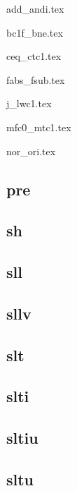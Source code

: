 

{add_andi.tex}

{bc1f_bne.tex}

{ceq_ctc1.tex}

{fabs_fsub.tex}

{j_lwc1.tex}

{mfc0_mtc1.tex}

{nor_ori.tex}

\subsection*{pre}

\subsection*{sh}

\subsection*{sll}

\subsection*{sllv}

\subsection*{slt}

\subsection*{slti}

\subsection*{sltiu}

\subsection*{sltu}

